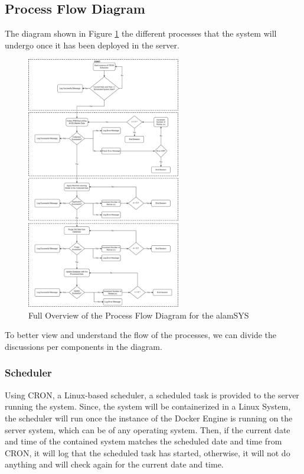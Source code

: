 \subsection{Process Flow Diagram}
\label{subsec:process_flow}
The diagram shown in Figure \ref{fig:process_flowchart} the different processes 
that the system will undergo once it has been deployed in the server.

\begin{figure}[ht]
    \centering
    \includegraphics[width=0.6\textwidth]{./assets/ProcessFlowchart.png}
    \caption{Full Overview of the Process Flow Diagram for the alamSYS}
    \label{fig:process_flowchart}
\end{figure}
\FloatBarrier

To better view and understand the flow of the processes, 
we can divide the discussions per components in the diagram.

\subsubsection{Scheduler}
\label{subsubsc:scheduler}
Using CRON, a Linux-based scheduler, a 
scheduled task is provided to the server running the system. Since, 
the system will be containerized in a Linux System, the scheduler will 
run once the instance of the Docker Engine is running on the server system, 
which can be of any operating system. Then, if the current date and time of 
the contained system matches the scheduled date and time from CRON, it will 
log that the scheduled task has started, otherwise, it will not do anything 
and will check again for the current date and time.
\hfill \\

